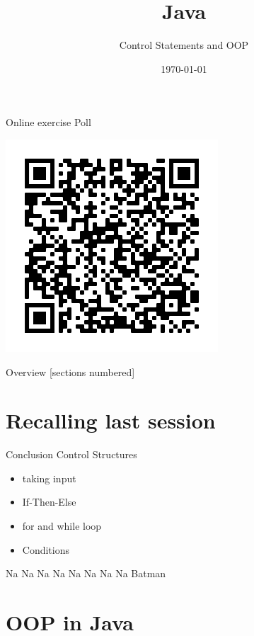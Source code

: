 


\title{Java}
\subtitle{Control Statements and OOP}
\date{\today}


	
	\begin{frame}{Online exercise Poll}
		\begin{center}
			\includegraphics[scale=.8]{Exercise_QR}
		\end{center}
	
	\end{frame}
	
	\begin{frame}
		\titlepage
	\end{frame}
	\begin{frame}{Overview}
		[sections numbered]
		\tableofcontents
	\end{frame}
	
	\section{Recalling last session}
	\begin{frame}{Conclusion}
		Control Structures
		\begin{itemize}
			\item taking input
			\item If-Then-Else
			\item for and while loop
			\item Conditions
		\end{itemize}
		Na Na Na Na Na Na Na Na Batman
	\end{frame}	
	
	\section{OOP in Java}
	
